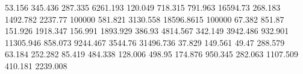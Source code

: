 53.156     345.436    %
287.335    6261.193   %
120.049    718.315    %
791.963    16594.73   %
268.183    1492.782   %
2237.77    100000     %
581.821    3130.558   %
18596.8615 100000     %
67.382     851.87     %
151.926    1918.347   %
156.991    1893.929   %
386.93     4814.567   %
342.149    3942.486   %
932.901    11305.946  %
858.073    9244.467   %
3544.76    31496.736  %
37.829     149.561    %
49.47      288.579    %
63.184     252.282    %
85.419     484.338    %
128.006    498.95     %
174.876    950.345    %
282.063    1107.509   %
410.181    2239.008   %
